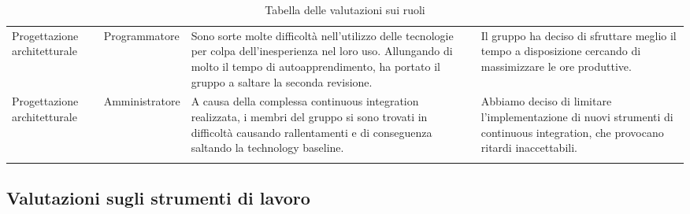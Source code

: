 \documentclass[../piano-di-qualifica.tex]{subfiles}
\begin{document}
\begin{longtable}[H]{>{\centering\arraybackslash}m{3cm} >{\centering\arraybackslash}m{3cm} >{\centering\arraybackslash}m{5cm} >{\centering\arraybackslash}m{5cm}}
  Progettazione architetturale  & Programmatore                 & Sono sorte molte difficoltà nell'utilizzo delle tecnologie per colpa dell'inesperienza nel loro uso. Allungando di molto il tempo di autoapprendimento, ha portato il gruppo a saltare la seconda revisione.  & Il gruppo ha deciso di sfruttare meglio il tempo a disposizione cercando di massimizzare le ore produttive.                                                                     \\
  Progettazione architetturale  & Amministratore                & A causa della complessa continuous integration realizzata, i membri del gruppo si sono trovati in difficoltà causando rallentamenti e di conseguenza saltando la technology baseline.                         & Abbiamo deciso di limitare l'implementazione di nuovi strumenti di continuous integration, che provocano ritardi inaccettabili.                                                 \\
  \rowcolor{white}
  \caption{Tabella delle valutazioni sui ruoli}%
  \label{tab:valutazioni_ruoli}
\end{longtable}

\newpage
\subsection{Valutazioni sugli strumenti di lavoro}
\end{document}
